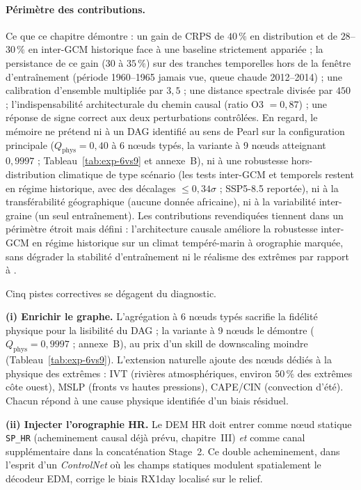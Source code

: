\paragraph{Périmètre des contributions.} Ce que ce chapitre démontre : un gain de CRPS de $40\,\%$ en distribution et de $28$--$30\,\%$ en inter-GCM historique face à une baseline strictement appariée ; la persistance de ce gain ($30$ à $35\,\%$) sur des tranches temporelles hors de la fenêtre d'entraînement (période 1960--1965 jamais vue, queue chaude 2012--2014) ; une calibration d'ensemble multipliée par $3{,}5$ ; une distance spectrale divisée par $450$ ; l'indispensabilité architecturale du chemin causal (ratio O3 $=0{,}87$) ; une réponse de signe correct aux deux perturbations contrôlées. En regard, le mémoire ne prétend ni à un DAG identifié au sens de Pearl sur la configuration principale ($Q_{\mathrm{phys}}=0{,}40$ à 6 nœuds typés, la variante à 9 nœuds atteignant $0{,}9997$ ; Tableau~\ref{tab:exp-6vs9} et annexe~B), ni à une robustesse hors-distribution climatique de type scénario (les tests inter-GCM et temporels restent en régime historique, avec des décalages $\leq 0{,}34\sigma$ ; SSP5-8.5 reportée), ni à la transférabilité géographique (aucune donnée africaine), ni à la variabilité inter-graine (un seul entraînement). Les contributions revendiquées tiennent dans un périmètre étroit mais défini : l'architecture causale améliore la robustesse inter-GCM en régime historique sur un climat tempéré-marin à orographie marquée, sans dégrader la stabilité d'entraînement ni le réalisme des extrêmes par rapport à \CorrDiff{}.

\label{sec:exp-perspectives}

Cinq pistes correctives se dégagent du diagnostic.

\textbf{(i) Enrichir le graphe.} L'agrégation à 6 nœuds typés sacrifie la fidélité physique pour la lisibilité du DAG ; la variante à 9 nœuds le démontre ($Q_{\mathrm{phys}}=0{,}9997$ ; annexe~B), au prix d'un skill de downscaling moindre (Tableau~\ref{tab:exp-6vs9}). L'extension naturelle ajoute des nœuds dédiés à la physique des extrêmes : IVT (rivières atmosphériques, environ $50\,\%$ des extrêmes côte ouest), MSLP (fronts vs hautes pressions), CAPE/CIN (convection d'été). Chacun répond à une cause physique identifiée d'un biais résiduel.

\textbf{(ii) Injecter l'orographie HR.} Le DEM HR doit entrer comme nœud statique \texttt{SP\_HR} (acheminement causal déjà prévu, chapitre~III) \emph{et} comme canal supplémentaire dans la concaténation Stage~2. Ce double acheminement, dans l'esprit d'un \emph{ControlNet} où les champs statiques modulent spatialement le décodeur EDM, corrige le biais RX1day localisé sur le relief.

